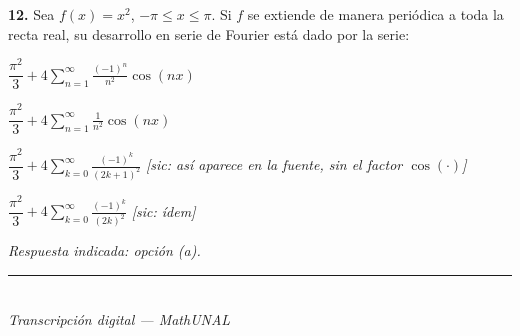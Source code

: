 \documentclass[11pt]{article}
\newcommand{\examfooter}{%
  \vfill
  \rule{\linewidth}{0.4pt}\\[1pt]
  {\scriptsize\textit{Transcripci\'on digital --- MathUNAL}\hfill\textcolor{unalblue}{\textbf{\thepage}}}
}
\begin{document}
\vspace{10pt}
\textbf{12.} Sea $f(x) = x^2$, $-\pi\leq x\leq \pi$. Si $f$ se extiende de manera peri\'odica a toda la recta real, su desarrollo en serie de Fourier est\'a dado por la serie:
\begin{opciones}
  \item $\dfrac{\pi^2}{3} + 4\displaystyle\sum_{n=1}^{\infty} \frac{(-1)^n}{n^2}\cos(nx)$
  \item $\dfrac{\pi^2}{3} + 4\displaystyle\sum_{n=1}^{\infty} \frac{1}{n^2}\cos(nx)$
  \item $\dfrac{\pi^2}{3} + 4\displaystyle\sum_{k=0}^{\infty} \frac{(-1)^k}{(2k+1)^2}$ \quad \textit{[sic: as\'i aparece en la fuente, sin el factor $\cos(\cdot)$]}
  \item $\dfrac{\pi^2}{3} + 4\displaystyle\sum_{k=0}^{\infty} \frac{(-1)^k}{(2k)^2}$ \quad \textit{[sic: \'idem]}
\end{opciones}
\textit{Respuesta indicada: opci\'on (a).}

\examfooter
\end{document}
